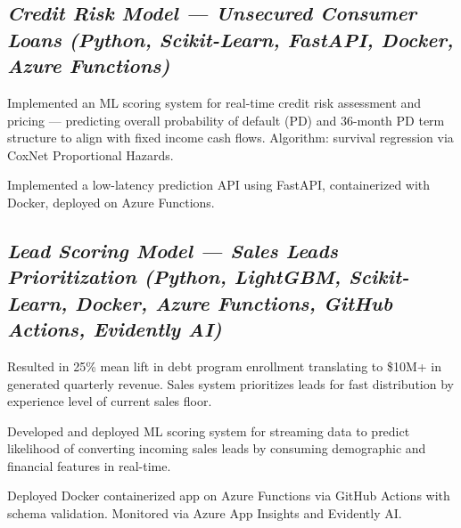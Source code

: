 \documentclass[letter,10pt]{article}
\begin{document}
\subsection{\textbf{\textit{Credit Risk Model — Unsecured Consumer Loans   (Python, Scikit-Learn, FastAPI, Docker, Azure Functions)}}}
\vspace{0.1em}
\begin{zitemize}
\item Implemented an ML scoring system for real-time credit risk assessment and pricing — predicting overall probability of default (PD) and 36-month PD term structure to align with fixed income cash flows. Algorithm: survival regression via CoxNet Proportional Hazards.
\item Implemented a low-latency prediction API using FastAPI, containerized with Docker, deployed on Azure Functions.
\end{zitemize}

\subsection{\textbf{\textit{Lead Scoring Model — Sales Leads Prioritization   (Python, LightGBM, Scikit-Learn, Docker, Azure Functions, GitHub Actions, Evidently AI)}}}
\vspace{0.1em}
\begin{zitemize}
\item Resulted in 25\% mean lift in debt program enrollment translating to \$10M+ in generated quarterly revenue. Sales system prioritizes leads for fast distribution by experience level of current sales floor.
\item Developed and deployed ML scoring system for streaming data to predict likelihood of converting incoming sales leads by consuming demographic and financial features in real-time.
\item Deployed Docker containerized app on Azure Functions via GitHub Actions with schema validation. Monitored via Azure App Insights and Evidently AI.
\end{zitemize}
\vspace{0.6em}

\end{document}
